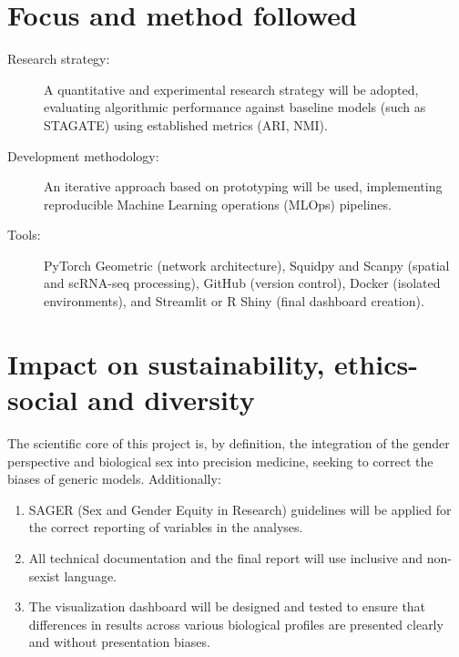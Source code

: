 \documentclass[ENG,BIB]{TFUOC}%
\begin{document}
\section{Focus and method followed}

\begin{description}
\item[Research strategy:] 
A quantitative and experimental research strategy will be adopted, evaluating algorithmic performance against baseline models (such as STAGATE) using established metrics (ARI, NMI).
\end{description}

\begin{description}
\item[Development methodology:] 
An iterative approach based on prototyping will be used, implementing reproducible Machine Learning operations (MLOps) pipelines.
\end{description}

\begin{description}
\item[Tools:] 
PyTorch Geometric (network architecture), Squidpy and Scanpy (spatial and scRNA-seq processing), GitHub (version control), Docker (isolated environments), and Streamlit or R Shiny (final dashboard creation).
\end{description}

\section{Impact on sustainability, ethics-social and diversity}
\label{s:etic}

The scientific core of this project is, by definition, the integration of the gender perspective and biological sex into precision medicine, seeking to correct the biases of generic models. Additionally:

\begin{enumerate}
\item SAGER (Sex and Gender Equity in Research) guidelines will be applied for the correct reporting of variables in the analyses.
\item All technical documentation and the final report will use inclusive and non-sexist language.
\item The visualization dashboard will be designed and tested to ensure that differences in results across various biological profiles are presented clearly and without presentation biases.
\end{enumerate}
\end{document}
